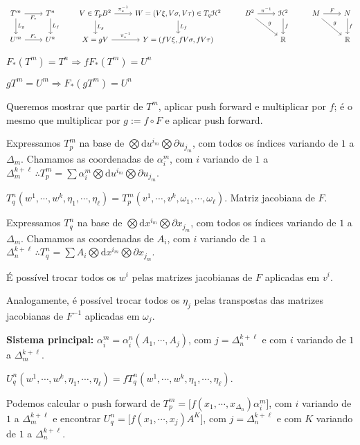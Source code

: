 \documentclass[12pt]{article}
\begin{document}
		\[
		\begin{tikzcd}
		T^m \arrow{d}{L_g} \arrow[swap]{r}{F_*} & T^n \arrow{d}{L_f} & V \in T_pB^2 \arrow{r}{\pi_*^{-1}} \arrow{d}{L_g} & W = (V\xi, V\sigma, V\tau) \in T_q{\mathcal{H}^2} \arrow{d}{L_f} & B^2 \arrow{r}{\pi^{-1}} \arrow{dr}{g} & \mathcal{H}^2 \arrow{d}{f} & M \arrow{r}{F} \arrow{dr}{g} & N \arrow{d}{f}   \\
		U^m \arrow{r}{F_*} & U^n & X = gV \arrow{r}{\pi_*^{-1}} &  Y = (fV\xi, fV\sigma, fV\tau) & & \mathbb{R} & & \mathbb{R}
		\end{tikzcd}
		\]

		$F_*(T^m) = T^n \Rightarrow f F_*(T^m) = U^n$

		$gT^m = U^m \Rightarrow F_*(g T^m) = U^n$

		Queremos mostrar que partir de $T^m$, aplicar push forward e multiplicar por $f$; \'e o mesmo que multiplicar por $g := f \circ F$ e aplicar push forward.

		Expressamos $T_p^m$ na base de $\bigotimes \mathrm{d}u^{i_m} \bigotimes \partial u_{j_m}$, com todos os \'indices variando de $1$ a $\Delta_m$. Chamamos as coordenadas de $\alpha_i^m$, com $i$ variando de $1$ a $\Delta_m^{k + \ell}\,\therefore T_p^m = \sum \alpha_i^m \bigotimes \mathrm{d}u^{i_m} \bigotimes \partial u_{j_m}$.

		$T_q^n(w^1,\cdots,w^k,\eta_1,\cdots,\eta_\ell) = T_p^m(v^1, \cdots, v^k, \omega_1, \cdots, \omega_\ell)$. Matriz jacobiana de $F$.

		Expressamos $T_q^n$ na base de $\bigotimes \mathrm{d}x^{i_m} \bigotimes \partial x_{j_m}$, com todos os \'indices variando de $1$ a $\Delta_m$. Chamamos as coordenadas de $A_i$, com $i$ variando de $1$ a $\Delta_n^{k + \ell}\,\therefore T_q^n = \sum A_i \bigotimes \mathrm{d}x^{i_m} \bigotimes \partial x_{j_m}$.

		\'E poss\'ivel trocar todos os $w^i$ pelas matrizes jacobianas de $F$ aplicadas em $v^i$.

		Analogamente, \'e poss\'ivel trocar todos os $\eta_j$ pelas transpostas das matrizes jacobianas de $F^{-1}$ aplicadas em $\omega_j$.

		\textbf{Sistema principal:} $\alpha_i^m = \alpha_i^n(A_1, \cdots, A_j)$, com $j = \Delta_n^{k + \ell}$ e com $i$ variando de $1$ a $\Delta_m^{k + \ell}$.

		$U_q^n(w^1, \cdots, w^k, \eta_1, \cdots, \eta_\ell) = f T_q^n(w^1, \cdots, w^k, \eta_1, \cdots, \eta_\ell)$.

		Podemos calcular o push forward de $T_p^m = \bigg[ f(x_1, \cdots, x_{\Delta_n}) \alpha_i^m \bigg]$, com $i$ variando de $1$ a $\Delta_m^{k + \ell}$ e encontrar $U_q^n = \bigg[ f(x_1, \cdots, x_j) A^K \bigg]$, com $j = \Delta_n^{k + \ell}$ e com $K$ variando de $1$ a $\Delta_n^{k + \ell}$.
\end{document}
